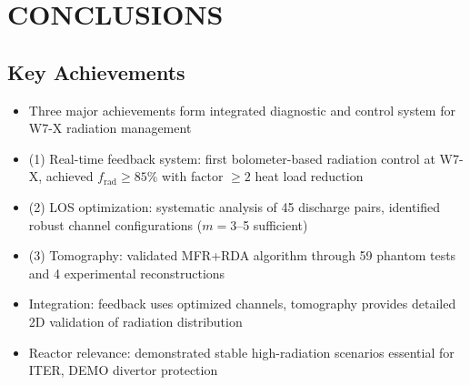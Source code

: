 \documentclass[11pt,a4paper]{article}
\begin{document}
\section{CONCLUSIONS}

\subsection{Key Achievements}

\begin{itemize}
\item Three major achievements form integrated diagnostic and control system for W7-X radiation management
\item (1) Real-time feedback system: first bolometer-based radiation control at W7-X, achieved $f_{\text{rad}}\geq85\%$ with factor $\geq2$ heat load reduction
\item (2) LOS optimization: systematic analysis of 45 discharge pairs, identified robust channel configurations ($m=3$--5 sufficient)
\item (3) Tomography: validated MFR+RDA algorithm through 59 phantom tests and 4 experimental reconstructions
\item Integration: feedback uses optimized channels, tomography provides detailed 2D validation of radiation distribution
\item Reactor relevance: demonstrated stable high-radiation scenarios essential for ITER, DEMO divertor protection
\end{itemize}
\end{document}
